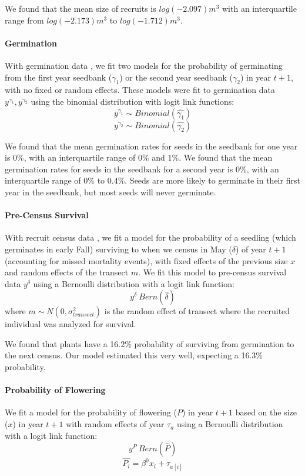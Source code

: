 \documentclass[11pt]{article}
\begin{document}
	We found that the mean size of recruits is $log(-2.097) m^3$ with an interquartile range from $log(-2.173) m^3$ to $log(-1.712) m^3$.
	
	
	
	\paragraph{Germination}
	With germination data \cite{Miller2009}, we fit two models for the probability of germinating from the first year seedbank ($\gamma_1$) or the second year seedbank ($\gamma_2$) in year $t+1$, with no fixed or random effects.
	These models were fit to germination data $y^{\gamma_1}, y^{\gamma_2}$  using the binomial distribution with logit link functions:
	$$y^{\gamma_1} \sim Binomial(\hat{\gamma_1})$$
	$$y^{\gamma_2} \sim Binomial(\hat{\gamma_2})$$
	
	We found that the mean germination rates for seeds in the seedbank for one year  is 0\%, with an interquartile range of 0\% and 1\%.
	We found that the mean germination rates for seeds in the seedbank for a second year is 0\%, with an interquartile range of 0\% to 0.4\%.
	Seeds are more likely to germinate in their first year in the seedbank, but most seeds will never germinate. 
	
	\paragraph{Pre-Census Survival}
	With recruit census data \cite{Miller2006}, we fit a model for the probability of a seedling (which germinates in early Fall) surviving to when we census in May ($\delta$) of year $t+1$ (accounting for missed mortality events), with fixed effects of the previous size $x$ and random effects of the transect $m$.
	We fit this model to pre-census survival data $y^{\delta}$ using a Bernoulli distribution with a logit link function: 
	$$y^{\delta} ~ Bern(\hat{\delta})$$
	where $m \sim N(0, \sigma_{transect}^2)$ is the random effect of transect where the recruited individual was analyzed for survival.
	
	We found that plants have a 16.2\% probability of surviving from germination to the next census.
	Our model estimated this very well, expecting a 16.3\% probability.
	
	\paragraph{Probability of Flowering}
	We fit a model for the probability of flowering ($P$) in year $t+1$ based on the size ($x$) in year $t+1$ with random effects of year $\tau_a$ using a Bernoulli distribution with a logit link function: 
	$$y^{P}~ Bern(\hat{P})$$
	$$\hat{P_i} = \beta^0 x_i + \tau_{a[i]}$$
	
\end{document}
